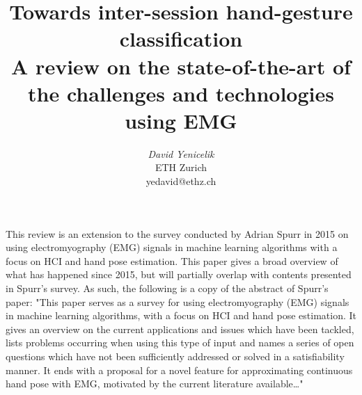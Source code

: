 \documentclass{article}
\begin{document}

\toappear{}

\title{Towards inter-session hand-gesture classification\\
	   \small{A review on the state-of-the-art of the challenges and technologies using EMG\\}
}


\author{
\parbox[t]{9cm}{\centering
	     {\em David Yenicelik}\\
	     ETH Zurich\\             
	     yedavid@ethz.ch}
}

\maketitle

\abstract
This review is an extension to the survey conducted by Adrian 
Spurr in 2015 \cite{Spurr} on using electromyography (EMG) 
signals in machine learning algorithms with a focus on HCI and 
hand pose estimation. This paper gives a broad overview 
of what has happened since 2015, but will partially overlap 
with contents presented in Spurr's survey. As such, the 
following is a copy of the abstract of Spurr's paper:
"This paper serves as a survey for using electromyography (EMG) signals in machine learning algorithms, with a focus on HCI and hand pose estimation. It gives an overview on the current applications and issues which have been tackled, lists problems occurring when using this type of input and names a series of open questions which have not been sufficiently addressed or solved in a satisfiability manner. It ends with a proposal for a novel feature for approximating continuous hand pose with EMG, motivated by the current literature available\ldots"
\end{document}
